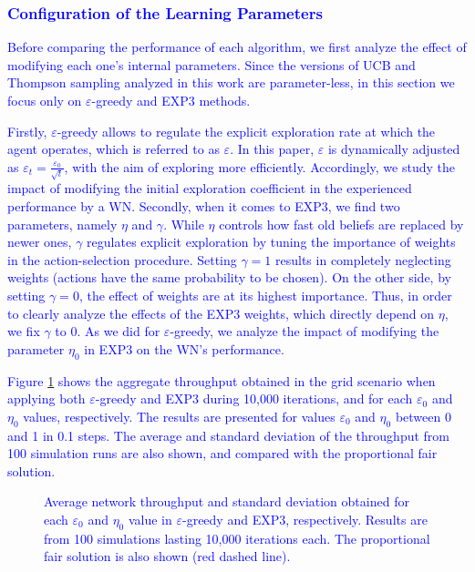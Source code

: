 \documentclass[preprint,12pt]{elsarticle}
\begin{document}
	\textcolor{blue}{\subsubsection{Configuration of the Learning Parameters}}
	
	\textcolor{blue}{Before comparing the performance of each algorithm, we first analyze the effect of modifying each one's internal parameters. Since the versions of UCB and Thompson sampling analyzed in this work are parameter-less, in this section we focus only on $\varepsilon$-greedy and EXP3 methods.}
	
	\textcolor{blue}{Firstly, $\varepsilon$-greedy allows to regulate the explicit exploration rate at which the agent operates, which is referred to as $\varepsilon$. In this paper, $\varepsilon$ is dynamically adjusted as $\varepsilon_t = \frac{\varepsilon_0}{\sqrt{t}}$, with the aim of exploring more efficiently. Accordingly, we study the impact of modifying the initial exploration coefficient in the experienced performance by a WN. Secondly, when it comes to EXP3, we find two parameters, namely $\eta$ and $\gamma$. While $\eta$ controls how fast old beliefs are replaced by newer ones, $\gamma$ regulates explicit exploration by tuning the importance of weights in the action-selection procedure. Setting $\gamma = 1$ results in completely neglecting weights (actions have the same probability to be chosen). On the other side, by setting $\gamma = 0$, the effect of weights are at its highest importance. Thus, in order to clearly analyze the effects of the EXP3 weights, which directly depend on $\eta$, we fix $\gamma$ to 0. As we did for $\varepsilon$-greedy, we analyze the impact of modifying the parameter $\eta_0$ in EXP3 on the WN's performance.}
	
	\textcolor{blue}{Figure \ref{fig:tuning_parameters} shows the aggregate throughput obtained in the grid scenario when applying both $\varepsilon$-greedy and EXP3 during 10,000 iterations, and for each $\varepsilon_0$ and $\eta_0$ values, respectively. The results are presented for values $\varepsilon_0$ and $\eta_0$ between 0 and 1 in 0.1 steps. The average and standard deviation of the throughput from 100 simulation runs are also shown, and compared with the proportional fair solution.}
	
	\begin{figure}[h!]
		\centering
		\label{fig:tuning_parameters}
		\caption{\textcolor{blue}{Average network throughput and standard deviation obtained for each $\varepsilon_0$ and $\eta_0$ value in $\varepsilon$-greedy and EXP3, respectively. Results are from 100 simulations lasting 10,000 iterations each. The proportional fair solution is also shown (red dashed line).}}
		\label{fig:tuning_parameters}
	\end{figure}
	
\end{document}
